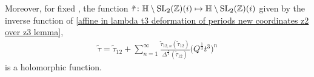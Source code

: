 \begin{Lemma}
Moreover, for fixed , the function
$
\tilde\tau\colon \mathbb{H}\setminus{ {\rm SL}_2(\mathbb{Z})(i) } \mapsto \mathbb{H}\setminus{{\rm SL}_2(\mathbb{Z})(i)}
$
given by the inverse function of \eqref{affine in lambda t3 deformation of periods new coordinates z2 over z3 lemma},
\begin{gather}\label{affine in lambda t3 deformation of periods new coordinates z2 over z3 inverse lemma}
\tilde\tau=\tilde\tau_{12}+\sum_{n=1}^{\infty}\frac{\tilde\tau_{12,n}(\tilde\tau_{12})}{\Delta^{\frac{n}{3}}(\tilde\tau_{12})} \bigl( Q^{\frac{1}{3}}t^3\bigr)^n
\end{gather}
is a holomorphic function.



 \end{Lemma}



